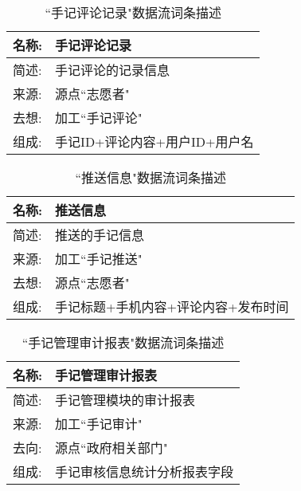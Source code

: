 \begin{table}[H]  
\caption{``手记评论记录"数据流词条描述}  
\begin{center}  
    \begin{tabular}{l p{11cm}} 
        \hline
        \quad 名称:  &   手记评论记录 \\
        \hline
        \quad 简述:  & 手记评论的记录信息 \\
        \hline
        \quad 来源:  & 源点``志愿者" \\
        \hline
        \quad 去想:  & 加工``手记评论" \\
        \hline
        \quad 组成:  & 手记ID+评论内容+用户ID+用户名 \\
        \hline
    \end{tabular}
    \label{tab1}
\end{center}
\end{table}

\begin{table}[H]  
\caption{``推送信息"数据流词条描述}  
\begin{center}  
    \begin{tabular}{l p{11cm}} 
        \hline
        \quad 名称:  &   推送信息 \\
        \hline
        \quad 简述:  & 推送的手记信息 \\
        \hline
        \quad 来源:  & 加工``手记推送" \\
        \hline
        \quad 去想:  & 源点``志愿者" \\
        \hline
        \quad 组成:  & 手记标题+手机内容+评论内容+发布时间 \\
        \hline
    \end{tabular}
    \label{tab1}
\end{center}
\end{table}

\begin{table}[H]  
\caption{``手记管理审计报表"数据流词条描述}  
\begin{center}  
    \begin{tabular}{l p{11cm}} 
        \hline
        \quad 名称:  &  手记管理审计报表 \\
        \hline
        \quad 简述:  & 手记管理模块的审计报表 \\
        \hline
        \quad 来源:  & 加工``手记审计" \\
        \hline
        \quad 去向:  & 源点``政府相关部门" \\
        \hline
        \quad 组成:  & 手记审核信息统计分析报表字段\\
        \hline
    \end{tabular}
    \label{tab1}
\end{center}
\end{table}
